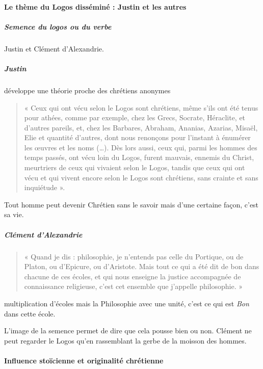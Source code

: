       
      \paragraph{Le thème du Logos disséminé : Justin et les autres}
      
     \subparagraph{Semence du logos ou du verbe} Justin  et Clément d'Alexandrie.
    
    \subparagraph{Justin} développe une théorie proche des chrétiens anonymes  
    \begin{quote}
« Ceux qui ont vécu selon le Logos sont chrétiens, même s'ils ont été
tenus pour athées, comme par exemple, chez les Grecs, Socrate,
Héraclite, et d'autres pareils, et, chez les Barbares, Abraham, Ananias,
Azarias, Misaël, Elie et quantité d'autres, dont nous renonçons pour
l'instant à énumérer les œuvres et les noms (\ldots). Dès lors aussi,
ceux qui, parmi les hommes des temps passés, ont vécu loin du Logos,
furent mauvais, ennemis du Christ, meurtriers de ceux qui vivaient selon
le Logos, tandis que ceux qui ont vécu et qui vivent encore selon le
Logos sont chrétiens, sans crainte et sans inquiétude ».
    \end{quote}
    Tout homme peut devenir Chrétien sans le savoir mais d'une certaine façon, c'est sa vie. 
    
\subparagraph{Clément d'Alexandrie} 

\begin{quote}
    

« Quand je dis : philosophie, je n'entends pas celle du Portique, ou de
Platon, ou d'Epicure, ou d'Aristote. Mais tout ce qui a été dit de bon
dans chacune de ces écoles, et qui nous enseigne la justice accompagnée
de connaissance religieuse, c'est cet ensemble que j'appelle
philosophie. »
\end{quote}
    multiplication d'écoles mais la Philosophie avec une unité, c'est ce qui est \emph{Bon} dans cette école. 
    
    \begin{Synthesis}
        L'image de la semence permet de dire que cela pousse bien ou non. Clément ne peut regarder le Logos qu'en rassemblant la gerbe de la moisson des hommes. 
    \end{Synthesis}
      
      \paragraph{Influence stoïcienne et originalité chrétienne}
      
